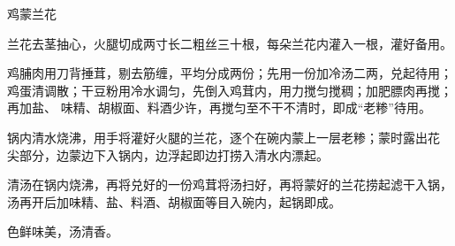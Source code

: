 %
%
%
%
%
%
%
\begin{recipe}{鸡蒙兰花}

\ingredients


\preparation

\step 兰花去茎抽心，火腿切成两寸长二粗丝三十根，每朵兰花内灌入一根，灌好备用。

\step 鸡脯肉用刀背捶茸，剔去筋缠，平均分成两份；先用一份加冷汤二两，兑起待用；
鸡蛋清调散；干豆粉用冷水调匀，先倒入鸡茸内，用力搅匀搅稠；加肥膘肉再搅；再加盐、
味精、胡椒面、料酒少许，再搅匀至不干不清时，即成“老糁”待用。

\step 锅内清水烧沸，用手将灌好火腿的兰花，逐个在碗内蒙上一层老糁；蒙时露出花
尖部分，边蒙边下入锅内，边浮起即边打捞入清水内漂起。

\step 清汤在锅内烧沸，再将兑好的一份鸡茸将汤扫好，再将蒙好的兰花捞起滤干入锅，
汤再开后加味精、盐、料酒、胡椒面等目入碗内，起锅即成。

\features

色鲜味美，汤清香。

\end{recipe}

